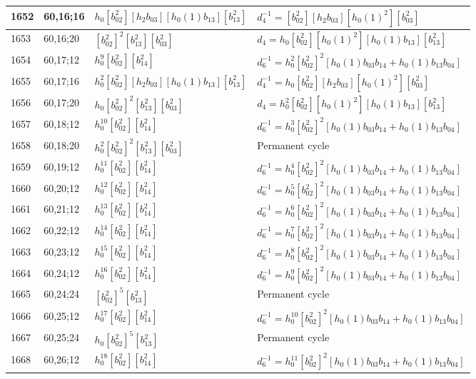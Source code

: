 \documentclass{article}
\begin{document}
\begin{longtable}{|l|l|>{\raggedright\arraybackslash}p{6cm}|>{\raggedright\arraybackslash}p{6cm}|}
\hline
1652 & 60,16;16 & $h_0[b_{02}^2][h_2b_{03}][h_0(1)b_{13}][b_{13}^2]$ & $d_{4}^{-1}=[b_{02}^2][h_2b_{03}][h_0(1)^2][b_{03}^2]$\\
\hline
1653 & 60,16;20 & $[b_{02}^2]^2[b_{13}^2][b_{03}^2]$ &$d_{4}=h_0[b_{02}^2][h_0(1)^2][h_0(1)b_{13}][b_{13}^2]$\\
\hline
1654 & 60,17;12 & $h_0^9[b_{02}^2][b_{14}^2]$ & $d_{6}^{-1}=h_0^2[b_{02}^2]^2[h_0(1)b_{03}b_{14} + h_0(1)b_{13}b_{04}]$\\
\hline
1655 & 60,17;16 & $h_0^2[b_{02}^2][h_2b_{03}][h_0(1)b_{13}][b_{13}^2]$ & $d_{4}^{-1}=h_0[b_{02}^2][h_2b_{03}][h_0(1)^2][b_{03}^2]$\\
\hline
1656 & 60,17;20 & $h_0[b_{02}^2]^2[b_{13}^2][b_{03}^2]$ &$d_{4}=h_0^2[b_{02}^2][h_0(1)^2][h_0(1)b_{13}][b_{13}^2]$\\
\hline
1657 & 60,18;12 & $h_0^{10}[b_{02}^2][b_{14}^2]$ & $d_{6}^{-1}=h_0^3[b_{02}^2]^2[h_0(1)b_{03}b_{14} + h_0(1)b_{13}b_{04}]$\\
\hline
1658 & 60,18;20 & $h_0^2[b_{02}^2]^2[b_{13}^2][b_{03}^2]$ & Permanent cycle\\
\hline
1659 & 60,19;12 & $h_0^{11}[b_{02}^2][b_{14}^2]$ & $d_{6}^{-1}=h_0^4[b_{02}^2]^2[h_0(1)b_{03}b_{14} + h_0(1)b_{13}b_{04}]$\\
\hline
1660 & 60,20;12 & $h_0^{12}[b_{02}^2][b_{14}^2]$ & $d_{6}^{-1}=h_0^5[b_{02}^2]^2[h_0(1)b_{03}b_{14} + h_0(1)b_{13}b_{04}]$\\
\hline
1661 & 60,21;12 & $h_0^{13}[b_{02}^2][b_{14}^2]$ & $d_{6}^{-1}=h_0^6[b_{02}^2]^2[h_0(1)b_{03}b_{14} + h_0(1)b_{13}b_{04}]$\\
\hline
1662 & 60,22;12 & $h_0^{14}[b_{02}^2][b_{14}^2]$ & $d_{6}^{-1}=h_0^7[b_{02}^2]^2[h_0(1)b_{03}b_{14} + h_0(1)b_{13}b_{04}]$\\
\hline
1663 & 60,23;12 & $h_0^{15}[b_{02}^2][b_{14}^2]$ & $d_{6}^{-1}=h_0^8[b_{02}^2]^2[h_0(1)b_{03}b_{14} + h_0(1)b_{13}b_{04}]$\\
\hline
1664 & 60,24;12 & $h_0^{16}[b_{02}^2][b_{14}^2]$ & $d_{6}^{-1}=h_0^9[b_{02}^2]^2[h_0(1)b_{03}b_{14} + h_0(1)b_{13}b_{04}]$\\
\hline
1665 & 60,24;24 & $[b_{02}^2]^5[b_{13}^2]$ & Permanent cycle\\
\hline
1666 & 60,25;12 & $h_0^{17}[b_{02}^2][b_{14}^2]$ & $d_{6}^{-1}=h_0^{10}[b_{02}^2]^2[h_0(1)b_{03}b_{14} + h_0(1)b_{13}b_{04}]$\\
\hline
1667 & 60,25;24 & $h_0[b_{02}^2]^5[b_{13}^2]$ & Permanent cycle\\
\hline
1668 & 60,26;12 & $h_0^{18}[b_{02}^2][b_{14}^2]$ & $d_{6}^{-1}=h_0^{11}[b_{02}^2]^2[h_0(1)b_{03}b_{14} + h_0(1)b_{13}b_{04}]$\\

\end{longtable}
\end{document}
